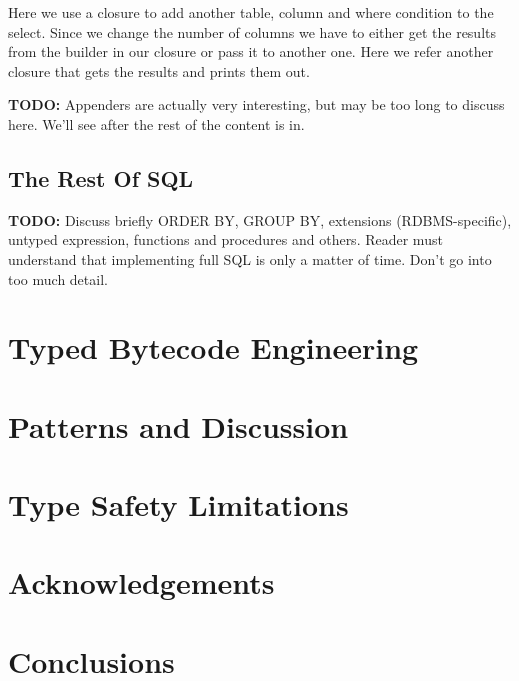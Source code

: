 \documentclass{sig-alternate}
\begin{document}
Here we use a closure to add another table, column and where condition to the select. Since we change the number of columns we have to either get the results from the builder in our closure or pass it to another one. Here we refer another closure that gets the results and prints them out.

\textbf{TODO:} Appenders are actually very interesting, but may be too long to discuss here. We'll see after the rest of the content is in.

\subsection{The Rest Of SQL}

\textbf{TODO:} Discuss briefly ORDER BY, GROUP BY, extensions (RDBMS-specific), untyped expression, functions and procedures and others. Reader must understand that implementing full SQL is only a matter of time. Don't go into too much detail.

\section{Typed Bytecode Engineering}

\section{Patterns and Discussion}

\section{Type Safety Limitations}

\section{Acknowledgements}

\section{Conclusions}



\end{document}
